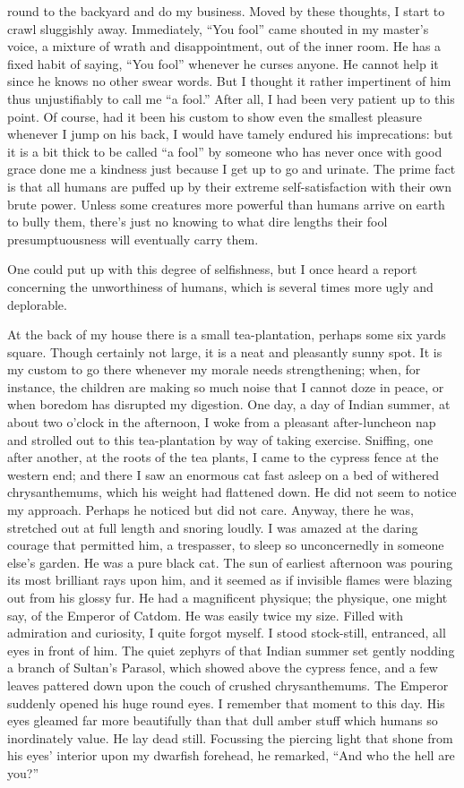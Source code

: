 \documentclass{book}
\begin{document}
round to the backyard and do my business. Moved by these thoughts, I
start to crawl sluggishly away. Immediately, ``You fool'' came shouted
in my master's voice, a mixture of wrath and disappointment, out of the
inner room. He has a fixed habit of saying, ``You fool'' whenever he
curses anyone. He cannot help it since he knows no other swear words.
But I thought it rather impertinent of him thus unjustifiably to call me
``a fool.'' After all, I had been very patient up to this point. Of
course, had it been his custom to show even the smallest pleasure
whenever I jump on his back, I would have tamely endured his
imprecations: but it is a bit thick to be called ``a fool'' by someone
who has never once with good grace done me a kindness just because I get
up to go and urinate. The prime fact is that all humans are puffed up by
their extreme self-satisfaction with their own brute power. Unless some
creatures more powerful than humans arrive on earth to bully them,
there's just no knowing to what dire lengths their fool presumptuousness
will eventually carry them.

One could put up with this degree of selfishness, but I once heard a
report concerning the unworthiness of humans, which is several times
more ugly and deplorable.

At the back of my house there is a small tea-plantation, perhaps some
six yards square. Though certainly not large, it is a neat and
pleasantly sunny spot. It is my custom to go there whenever my morale
needs strengthening; when, for instance, the children are making so much
noise that I cannot doze in peace, or when boredom has disrupted my
digestion. One day, a day of Indian summer, at about two o'clock in the
afternoon, I woke from a pleasant after-luncheon nap and strolled out to
this tea-plantation by way of taking exercise. Sniffing, one after
another, at the roots of the tea plants, I came to the cypress fence at
the western end; and there I saw an enormous cat fast asleep on a bed of
withered chrysanthemums, which his weight had flattened down. He did not
seem to notice my approach. Perhaps he noticed but did not care. Anyway,
there he was, stretched out at full length and snoring loudly. I was
amazed at the daring courage that permitted him, a trespasser, to sleep
so unconcernedly in someone else's garden. He was a pure black cat. The
sun of earliest afternoon was pouring its most brilliant rays upon him,
and it seemed as if invisible flames were blazing out from his glossy
fur. He had a magnificent physique; the physique, one might say, of the
Emperor of Catdom. He was easily twice my size. Filled with admiration
and curiosity, I quite forgot myself. I stood stock-still, entranced,
all eyes in front of him. The quiet zephyrs of that Indian summer set
gently nodding a branch of Sultan's Parasol, which showed above the
cypress fence, and a few leaves pattered down upon the couch of crushed
chrysanthemums. The Emperor suddenly opened his huge round eyes. I
remember that moment to this day. His eyes gleamed far more beautifully
than that dull amber stuff which humans so inordinately value. He lay
dead still. Focussing the piercing light that shone from his eyes'
interior upon my dwarfish forehead, he remarked, ``And who the hell are
you?''
\end{document}
